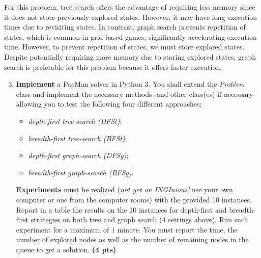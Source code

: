 \documentclass[11pt,a4paper]{../template/report}
\begin{document}
\begin{answers}[4cm]
For this problem, tree search offers the advantage of requiring less memory since it does not store previously explored states. However, it may have long execution times due to revisiting states. In contrast, graph search prevents repetition of states, which is common in grid-based games, significantly accelerating execution time. However, to prevent repetition of states, we must store explored states. \\
Despite potentially requiring more memory due to storing explored states, graph search is preferable for this problem because it offers faster execution.
\end{answers}



\begin{enumerate}
\setcounter{enumi}{2}
    \item \textbf{Implement} a PacMan solver in Python 3.
			You shall extend the \emph{Problem} class and implement the necessary methods -and other class(es) if necessary- allowing you to test the following four different approaches: 
			\begin{itemize}
			\item \textit{depth-first tree-search (DFSt)};
			\item \textit{breadth-first tree-search (BFSt)};
			\item \textit{depth-first graph-search (DFSg)};
			\item \textit{breadth-first graph-search (BFSg)}. 
			\end{itemize}

    \textbf{Experiments} must be realized (\textit{not yet on INGInious!} use your own computer or one from the computer rooms) with the provided 10 instances. Report in a table the results on the 10 instances for depth-first and breadth-first strategies on both tree and graph search (4 settings above). Run each experiment for a maximum of 1 minute. You must report the time, the number of explored nodes as well as the number of remaining nodes in the queue to get a solution. \textbf{(4 pts)}
\end{enumerate}
\end{document}
